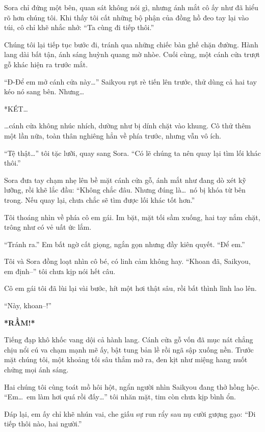 \documentclass[../main.tex]{subfiles}
\begin{document}
Sora chỉ đứng một bên, quan sát không nói gì, nhưng ánh mắt cô ấy như đã hiểu rõ hơn chúng tôi. Khi thấy tôi cất những bộ phận của đồng hồ đeo tay lại vào túi, cô chỉ khẽ nhắc nhở: ``Ta cùng đi tiếp thôi.''

Chúng tôi lại tiếp tục bước đi, tránh qua những chiếc bàn ghế chặn đường. Hành lang dài bất tận, ánh sáng huỳnh quang mờ nhòe. Cuối cùng, một cánh cửa trượt gỗ khác hiện ra trước mắt.

``Đ-Để em mở cánh cửa này\dots'' Saikyou rụt rè tiến lên trước, thử dùng cả hai tay kéo nó sang bên. Nhưng\dots

*KÉT\dots*

\dots cánh cửa không nhúc nhích, dường như bị dính chặt vào khung. Cô thử thêm một lần nữa, toàn thân nghiêng hẳn về phía trước, nhưng vẫn vô ích.

``Tệ thật\dots'' tôi tặc lưỡi, quay sang Sora. ``Có lẽ chúng ta nên quay lại tìm lối khác thôi.''

Sora đưa tay chạm nhẹ lên bề mặt cánh cửa gỗ, ánh mắt như đang dò xét kỹ lưỡng, rồi khẽ lắc đầu: ``Không chắc đâu. Nhưng đúng là\dots\ nó bị khóa từ bên trong. Nếu quay lại, chưa chắc sẽ tìm được lối khác tốt hơn.''

Tôi thoáng nhìn về phía cô em gái. Im bặt, mặt tối sầm xuống, hai tay nắm chặt, trông như có vẻ uất ức lắm.

``Tránh ra.'' Em bất ngờ cất giọng, ngắn gọn nhưng đầy kiên quyết. ``Để em.''

Tôi và Sora đồng loạt nhìn cô bé, có linh cảm không hay. ``Khoan đã, Saikyou, em định--'' tôi chưa kịp nói hết câu.

Cô em gái tôi đã lùi lại vài bước, hít một hơi thật sâu, rồi bất thình lình lao lên.

``Này, khoan--!''

\textbf{*RẦM!*}

Tiếng đạp khô khốc vang dội cả hành lang. Cánh cửa gỗ vốn đã mục nát chẳng chịu nổi cú va chạm mạnh mẽ ấy, bật tung bản lề rồi ngã sập xuống nền. Trước mặt chúng tôi, một khoảng tối sâu thẳm mở ra, đen kịt như miệng hang nuốt chửng mọi ánh sáng.

Hai chúng tôi cùng toát mồ hôi hột, ngẩn người nhìn Saikyou đang thở hồng hộc. ``Em\dots\ em làm hơi quá rồi đấy\dots'' tôi nhăn mặt, tim còn chưa kịp bình ổn.

Đáp lại, em ấy chỉ khẽ nhún vai, che giấu sự run rẩy sau nụ cười gượng gạo: ``Đi tiếp thôi nào, hai người.''

\ct
\end{document}
